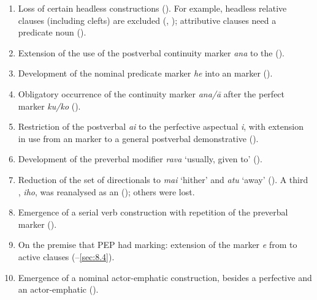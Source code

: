 \begin{enumerate}
\item 
Loss of certain headless  constructions (). For example, headless relative clauses (including clefts) are excluded (, ); attributive clauses need a predicate noun (). 

\item 
Extension of the use of the postverbal continuity marker \textit{{\ꞌ}ana} to the  ().

\item 
Development of the nominal predicate marker \textit{he} into an  marker ().

\item 
Obligatory occurrence of the continuity marker \textit{{\ꞌ}ana/{\ꞌ}ā} after the perfect  marker \textit{ku/ko} ().

\item 
Restriction of the postverbal   \textit{ai} to the perfective aspectual \textit{i}, with extension in use from an  marker to a general postverbal demonstrative ().

\item 
Development of the preverbal modifier \textit{rava} ‘usually, given to’ ().

\item 
Reduction of the set of directionals to \textit{mai} ‘hither’ and \textit{atu} ‘away’ (). A third , \textit{iho}, was reanalysed as an  (); others were lost.

\item 
Emergence of a serial verb construction with repetition of the preverbal marker ().

\item 
On the premise that PEP had  marking: extension of the  marker \textit{e} from  to active clauses (–\ref{sec:8.4}).

\item 
Emergence of a nominal actor-emphatic construction, besides a perfective and an  actor-emphatic ().


\end{enumerate}
